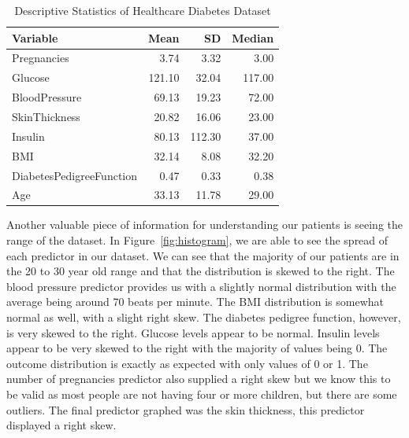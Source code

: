 \documentclass[12pt]{article}
\begin{document}
\begin{table}[ht]
    \caption{Descriptive Statistics of Healthcare Diabetes Dataset}
  \label{tab:ds}
\centering
\begin{tabular}{lrrr}
      \hline
    Variable & Mean & SD & Median \\ 
      \hline
      Pregnancies & 3.74 & 3.32 & 3.00 \\ 
      Glucose & 121.10 & 32.04 & 117.00 \\ 
      BloodPressure & 69.13 & 19.23 & 72.00 \\ 
      SkinThickness & 20.82 & 16.06 & 23.00 \\ 
      Insulin & 80.13 & 112.30 & 37.00 \\ 
      BMI & 32.14 & 8.08 & 32.20 \\ 
      DiabetesPedigreeFunction & 0.47 & 0.33 & 0.38 \\ 
      Age & 33.13 & 11.78 & 29.00 \\ 
       \hline
    \end{tabular}
    \end{table}

  Another valuable piece of information for understanding our patients is seeing the range of the dataset. In Figure~\ref{fig:histogram}, we
  are able to see the spread of each predictor in our dataset. We can see that the majority of our patients are in the 20 to 30 year old range and that the distribution is skewed to the right. 
  The blood pressure predictor provides us with a slightly normal distribution with the average being around 70 beats per minute. The BMI
  distribution is somewhat normal as well, with a slight right skew. The diabetes pedigree function, however, is very skewed to the right. Glucose
  levels appear to be normal. Insulin levels appear to be very skewed to the right with the majority of values being 0. The outcome distribution
  is exactly as expected with only values of 0 or 1. The
  number of pregnancies predictor also supplied a right skew but we know this to be valid as most people are not having four or more children, but there are some outliers. The 
  final predictor graphed was the skin thickness, this predictor displayed a right skew.
\end{document}
